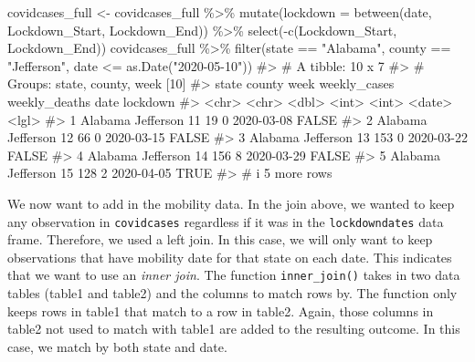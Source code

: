 \documentclass[
  letterpaper,
]{krantz}
\makeatletter
\newenvironment{Shaded}{\begin{snugshade}}{\end{snugshade}}
\newcommand{\AttributeTok}[1]{\textcolor[rgb]{0.40,0.45,0.13}{#1}}
\newcommand{\CommentTok}[1]{\textcolor[rgb]{0.37,0.37,0.37}{#1}}
\newcommand{\FunctionTok}[1]{\textcolor[rgb]{0.28,0.35,0.67}{#1}}
\newcommand{\NormalTok}[1]{\textcolor[rgb]{0.00,0.23,0.31}{#1}}
\newcommand{\OtherTok}[1]{\textcolor[rgb]{0.00,0.23,0.31}{#1}}
\newcommand{\SpecialCharTok}[1]{\textcolor[rgb]{0.37,0.37,0.37}{#1}}
\newcommand{\StringTok}[1]{\textcolor[rgb]{0.13,0.47,0.30}{#1}}
\newenvironment{kframe}{%
\medskip{}
\setlength{\fboxsep}{.8em}
 \def\at@end@of@kframe{}%
 \ifinner\ifhmode%
  \def\at@end@of@kframe{\end{minipage}}%
  \begin{minipage}{\columnwidth}%
 \fi\fi%
 \def\FrameCommand##1{\hskip\@totalleftmargin \hskip-\fboxsep
 \colorbox{shadecolor}{##1}\hskip-\fboxsep
     \hskip-\linewidth \hskip-\@totalleftmargin \hskip\columnwidth}%
 \MakeFramed {\advance\hsize-\width
   \@totalleftmargin\z@ \linewidth\hsize
   \@setminipage}}%
 {\par\unskip\endMakeFramed%
 \at@end@of@kframe}
\renewenvironment{Shaded}{\begin{kframe}}{\end{kframe}}
\makeatother
\begin{document}
\begin{Shaded}
\begin{Highlighting}[]
\NormalTok{covidcases\_full }\OtherTok{\textless{}{-}}\NormalTok{ covidcases\_full }\SpecialCharTok{\%\textgreater{}\%}
  \FunctionTok{mutate}\NormalTok{(}\AttributeTok{lockdown =} \FunctionTok{between}\NormalTok{(date, Lockdown\_Start, Lockdown\_End)) }\SpecialCharTok{\%\textgreater{}\%}
  \FunctionTok{select}\NormalTok{(}\SpecialCharTok{{-}}\FunctionTok{c}\NormalTok{(Lockdown\_Start, Lockdown\_End)) }
\NormalTok{covidcases\_full }\SpecialCharTok{\%\textgreater{}\%}
  \FunctionTok{filter}\NormalTok{(state }\SpecialCharTok{==} \StringTok{"Alabama"}\NormalTok{, county }\SpecialCharTok{==} \StringTok{"Jefferson"}\NormalTok{, }
\NormalTok{         date }\SpecialCharTok{\textless{}=} \FunctionTok{as.Date}\NormalTok{(}\StringTok{"2020{-}05{-}10"}\NormalTok{))}
\CommentTok{\#\textgreater{} \# A tibble: 10 x 7}
\CommentTok{\#\textgreater{} \# Groups:   state, county, week [10]}
\CommentTok{\#\textgreater{}   state   county     week weekly\_cases weekly\_deaths date       lockdown}
\CommentTok{\#\textgreater{}   \textless{}chr\textgreater{}   \textless{}chr\textgreater{}     \textless{}dbl\textgreater{}        \textless{}int\textgreater{}         \textless{}int\textgreater{} \textless{}date\textgreater{}     \textless{}lgl\textgreater{}   }
\CommentTok{\#\textgreater{} 1 Alabama Jefferson    11           19             0 2020{-}03{-}08 FALSE   }
\CommentTok{\#\textgreater{} 2 Alabama Jefferson    12           66             0 2020{-}03{-}15 FALSE   }
\CommentTok{\#\textgreater{} 3 Alabama Jefferson    13          153             0 2020{-}03{-}22 FALSE   }
\CommentTok{\#\textgreater{} 4 Alabama Jefferson    14          156             8 2020{-}03{-}29 FALSE   }
\CommentTok{\#\textgreater{} 5 Alabama Jefferson    15          128             2 2020{-}04{-}05 TRUE    }
\CommentTok{\#\textgreater{} \# i 5 more rows}
\end{Highlighting}
\end{Shaded}

We now want to add in the mobility data. In the join above, we wanted to
keep any observation in \texttt{covidcases} regardless if it was in the
\texttt{lockdowndates} data frame. Therefore, we used a left join. In
this case, we will only want to keep observations that have mobility
date for that state on each date. This indicates that we want to use an
\emph{inner join}. The function \texttt{inner\_join()} takes in two data
tables (table1 and table2) and the columns to match rows by. The
function only keeps rows in table1 that match to a row in table2. Again,
those columns in table2 not used to match with table1 are added to the
resulting outcome. In this case, we match by both state and date.
\end{document}

